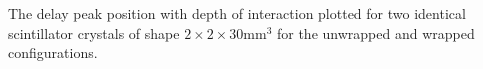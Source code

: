 \label{fig:centroidposition} The delay peak position with depth of interaction plotted for two identical scintillator crystals of shape $2\times2\times30$mm$^3$ for the unwrapped and wrapped configurations.